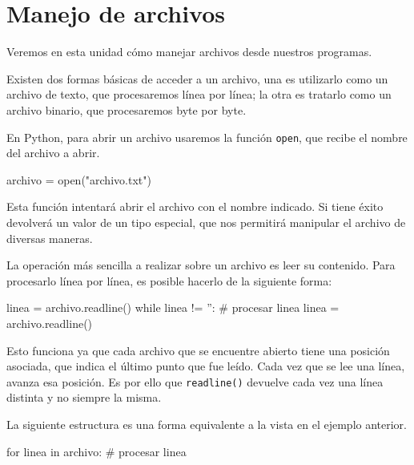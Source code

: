

\chapter{Manejo de archivos}
\label{uni:archivos}

Veremos en esta unidad cómo manejar archivos desde nuestros
programas.

Existen dos formas básicas de acceder a un archivo, una es
utilizarlo como un archivo de texto, que procesaremos línea por
línea; la otra es tratarlo como un archivo binario, que
procesaremos byte por byte.

En Python, para abrir un archivo usaremos la función \lstinline!open!, que
recibe el nombre del archivo a abrir.

\begin{codigo-python-sn}
archivo = open("archivo.txt")
\end{codigo-python-sn}

Esta función intentará abrir el archivo con el nombre indicado.  Si tiene
éxito devolverá un valor de un tipo especial, que nos permitirá manipular el
archivo de diversas maneras.

La operación más sencilla a realizar sobre un archivo es leer su contenido.
Para procesarlo línea por línea, es posible hacerlo de la siguiente forma:

\begin{codigo-python-sn}
linea = archivo.readline()
while linea != '':
    # procesar linea
    linea = archivo.readline()
\end{codigo-python-sn}

Esto funciona ya que cada archivo que se encuentre abierto tiene una
posición asociada, que indica el último punto que fue leído.  Cada vez que
se lee una línea, avanza esa posición. Es por ello que
\lstinline!readline()! devuelve cada vez una línea distinta y no siempre la
misma.

La siguiente estructura es una forma equivalente a la vista en el ejemplo
anterior.

\begin{codigo-python-sn}
for linea in archivo:
    # procesar linea
\end{codigo-python-sn}

